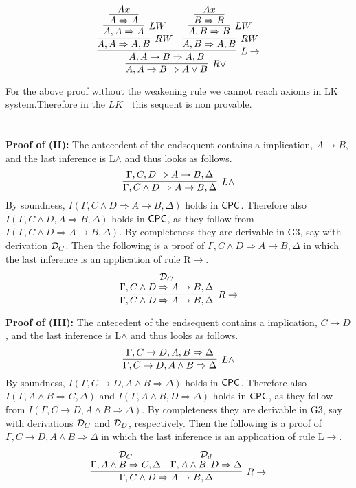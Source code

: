 \documentclass[11pt]{article}
\newcommand{\cpc}{{\sf CPC}}
\newcommand{\Gth}{{\sf G3}}
\newcommand{\cald}{{\cal D}}
\newcommand{\Ga}{\Gamma}
\newcommand{\De}{\Delta}
\newcommand{\imp}{\rightarrow}
\newcommand{\en}{\wedge}
\newcommand{\of}{\vee}
\newcommand{\seq}{\Rightarrow}
\begin{document}
\section{}

\[
\infer[R \of]{A,A \imp B \seq A \of B}
{\infer[L \imp]{A,A \imp B \seq A,B}{
{\infer[RW]{A,A \seq A,B}{\infer[LW]{A,A \seq A}{\infer[]{A \seq A}{Ax}}}}
&
{\infer[RW]{A,B \seq A,B}
{\infer[LW]{A,B \seq B}{\infer[]{B \seq B}{Ax}}}
}
}}
\]

For the above proof without the weakening rule we cannot reach axioms in LK system.Therefore in the $LK^-$ this sequent is non provable.

\section{}


{\bf Proof of (II):}
The antecedent of the endsequent contains a implication, $A \imp B$, and the last inference is L$\en$ and thus looks as follows. 
\[
 \infer[L \en]{\Ga, C\en D \seq A \imp B,\De}{\Ga,C,D \seq A\imp B, \De} 
\]
By soundness, $I(\Ga, C\en D \seq A \imp B,\De)$ holds in $\cpc$. Therefore also 
$I(\Ga ,C \en D ,A \seq B, \De)$ holds in $\cpc$, as they follow from $I(\Ga, C\en D \seq A \imp B,\De)$. By completeness they are derivable in \Gth, say with derivation $\cald_C$. Then the following is a proof of $\Ga, C\en D \seq A \imp B,\De$ in which the last inference is an application of rule R$\imp$. 
\[
 \infer[R \imp]{\Ga, C\en D \seq A \imp B,\De}{\deduce[\cald_C]
 {\Ga, C\en D \seq A \imp B,\De}{} }
\]
 
{\bf Proof of (III):} 
The antecedent of the endsequent contains a implication, $C \imp D$, and the last inference is L$\en$ and thus looks as follows. 
\[
 \infer[L \en]
 {\Ga,C \imp D,A \en B \seq \De}
 {\Ga ,C \imp D, A,B \seq \De} 
\]
By soundness, $I(\Ga,C \imp D,A \en B \seq \De)$ holds in $\cpc$. Therefore also 
$I(\Ga , A \en B \seq C,\De)$ and $I(\Ga , A \en B,D \seq \De)$ holds in $\cpc$, as they follow from $I(\Ga,C \imp D,A \en B \seq \De)$. By completeness they are derivable in \Gth, say with derivations $\cald_C$ and $\cald_D$, respectively. Then the following is a proof of $\Ga,C \imp D,A \en B \seq \De$ in which the last inference is an application of rule L$\imp$. 
\[
 \infer[R \imp]{\Ga, C\en D \seq A \imp B,\De}{\deduce[\cald_C]
 {\Ga, A \en B \seq C,\De}
 {} & \deduce[\cald_d]
 {\Ga,A \en B ,D \seq \De}
 {} }
\]


\section{}
\end{document}
